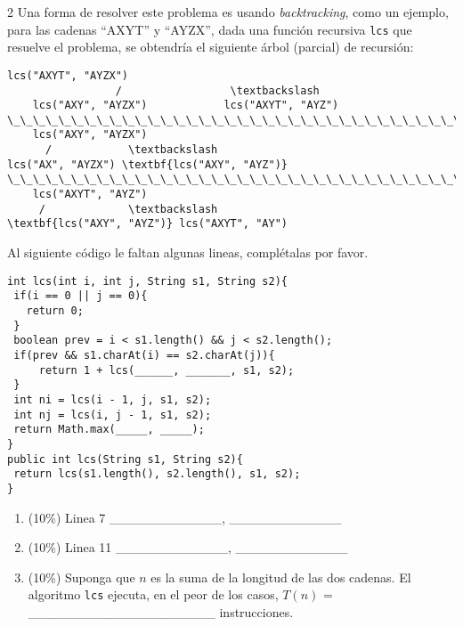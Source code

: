 \documentclass[10 pt]{article}
\begin{document}
\begin{multicols}{2}
Una forma de resolver este problema es usando \emph{backtracking}, como un ejemplo, para las cadenas  ``AXYT'' y  ``AYZX'', dada una función recursiva \texttt{lcs} 
que resuelve el problema, se obtendría el siguiente árbol (parcial) de recursión:

{\scriptsize
\begin{Verbatim}[commandchars=\\\{\},codes={\catcode`$=3\catcode`_=8}]
                 lcs("AXYT", "AYZX")
                 /                 \textbackslash
    lcs("AXY", "AYZX")            lcs("AXYT", "AYZ")
\_\_\_\_\_\_\_\_\_\_\_\_\_\_\_\_\_\_\_\_\_\_\_\_\_\_\_\_\_\_\_\_\_\_\_\_\_\_\_\_\_\_\_\_\_\_\_\_\_\_\_\_\_\_\_\_\_\_\_\_\_\_\_\_\_\_\_\_\_\_\_\_
    lcs("AXY", "AYZX")          
      /            \textbackslash               
lcs("AX", "AYZX") \textbf{lcs("AXY", "AYZ")}
\_\_\_\_\_\_\_\_\_\_\_\_\_\_\_\_\_\_\_\_\_\_\_\_\_\_\_\_\_\_\_\_\_\_\_\_\_\_\_\_\_\_\_\_\_\_\_\_\_\_\_\_\_\_\_\_\_\_\_\_\_\_\_\_\_\_\_\_\_\_\_\_\_
    lcs("AXYT", "AYZ")
     /             \textbackslash
\textbf{lcs("AXY", "AYZ")} lcs("AXYT", "AY")
\end{Verbatim}
}



Al siguiente código le faltan algunas lineas, complétalas por favor.

{\footnotesize
\begin{lstlisting}
int lcs(int i, int j, String s1, String s2){
 if(i == 0 || j == 0){
   return 0;   
 }
 boolean prev = i < s1.length() && j < s2.length();
 if(prev && s1.charAt(i) == s2.charAt(j)){
     return 1 + lcs(______, _______, s1, s2);
 }
 int ni = lcs(i - 1, j, s1, s2);
 int nj = lcs(i, j - 1, s1, s2);
 return Math.max(_____, _____);
}
public int lcs(String s1, String s2){
 return lcs(s1.length(), s2.length(), s1, s2);
}
\end{lstlisting}
}
\begin{enumerate}[label=\alph*)]
 \item (10\%) Linea 7  \_\_\_\_\_\_\_\_\_\_\_\_, \_\_\_\_\_\_\_\_\_\_\_\_ \\
 \item (10\%) Linea 11 \_\_\_\_\_\_\_\_\_\_\_\_, \_\_\_\_\_\_\_\_\_\_\_\_ \\
 \item (10\%) Suponga que $n$ es la suma de la longitud de las dos cadenas. El algoritmo \texttt{lcs} ejecuta, en el
 peor de los casos, $T(n)$ = \_\_\_\_\_\_\_\_\_\_\_\_\_\_\_\_\_\_\_\_ instrucciones. \\
\end{enumerate}


\end{multicols}
\end{document}
